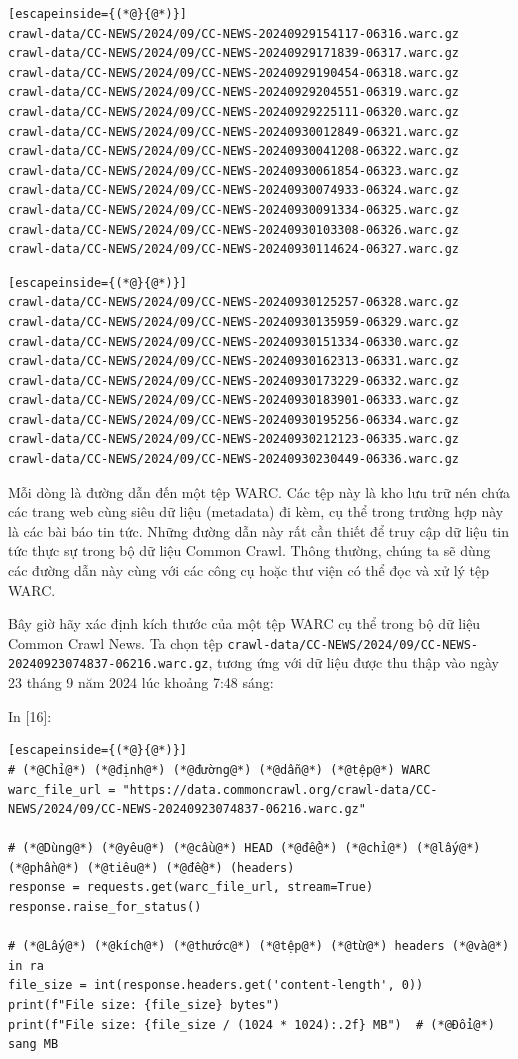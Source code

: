 \begin{lstlisting}[escapeinside={(*@}{@*)}]
crawl-data/CC-NEWS/2024/09/CC-NEWS-20240929154117-06316.warc.gz
crawl-data/CC-NEWS/2024/09/CC-NEWS-20240929171839-06317.warc.gz
crawl-data/CC-NEWS/2024/09/CC-NEWS-20240929190454-06318.warc.gz
crawl-data/CC-NEWS/2024/09/CC-NEWS-20240929204551-06319.warc.gz
crawl-data/CC-NEWS/2024/09/CC-NEWS-20240929225111-06320.warc.gz
crawl-data/CC-NEWS/2024/09/CC-NEWS-20240930012849-06321.warc.gz
crawl-data/CC-NEWS/2024/09/CC-NEWS-20240930041208-06322.warc.gz
crawl-data/CC-NEWS/2024/09/CC-NEWS-20240930061854-06323.warc.gz
crawl-data/CC-NEWS/2024/09/CC-NEWS-20240930074933-06324.warc.gz
crawl-data/CC-NEWS/2024/09/CC-NEWS-20240930091334-06325.warc.gz
crawl-data/CC-NEWS/2024/09/CC-NEWS-20240930103308-06326.warc.gz
crawl-data/CC-NEWS/2024/09/CC-NEWS-20240930114624-06327.warc.gz
\end{lstlisting}

\begin{lstlisting}[escapeinside={(*@}{@*)}]
crawl-data/CC-NEWS/2024/09/CC-NEWS-20240930125257-06328.warc.gz
crawl-data/CC-NEWS/2024/09/CC-NEWS-20240930135959-06329.warc.gz
crawl-data/CC-NEWS/2024/09/CC-NEWS-20240930151334-06330.warc.gz
crawl-data/CC-NEWS/2024/09/CC-NEWS-20240930162313-06331.warc.gz
crawl-data/CC-NEWS/2024/09/CC-NEWS-20240930173229-06332.warc.gz
crawl-data/CC-NEWS/2024/09/CC-NEWS-20240930183901-06333.warc.gz
crawl-data/CC-NEWS/2024/09/CC-NEWS-20240930195256-06334.warc.gz
crawl-data/CC-NEWS/2024/09/CC-NEWS-20240930212123-06335.warc.gz
crawl-data/CC-NEWS/2024/09/CC-NEWS-20240930230449-06336.warc.gz
\end{lstlisting}

Mỗi dòng là đường dẫn đến một tệp WARC. Các tệp này là kho lưu trữ nén chứa các trang web cùng siêu dữ liệu (metadata) đi kèm, cụ thể trong trường hợp này là các bài báo tin tức. Những đường dẫn này rất cần thiết để truy cập dữ liệu tin tức thực sự trong bộ dữ liệu Common Crawl. Thông thường, chúng ta sẽ dùng các đường dẫn này cùng với các công cụ hoặc thư viện có thể đọc và xử lý tệp WARC.

Bây giờ hãy xác định kích thước của một tệp WARC cụ thể trong bộ dữ liệu Common Crawl News. Ta chọn tệp \texttt{crawl-data/CC-NEWS/2024/09/CC-NEWS-20240923074837-06216.warc.gz}, tương ứng với dữ liệu được thu thập vào ngày 23 tháng 9 năm 2024 lúc khoảng 7:48 sáng:

In {[}16{]}:

\begin{lstlisting}[escapeinside={(*@}{@*)}]
# (*@Chỉ@*) (*@định@*) (*@đường@*) (*@dẫn@*) (*@tệp@*) WARC
warc_file_url = "https://data.commoncrawl.org/crawl-data/CC-NEWS/2024/09/CC-NEWS-20240923074837-06216.warc.gz"

# (*@Dùng@*) (*@yêu@*) (*@cầu@*) HEAD (*@để@*) (*@chỉ@*) (*@lấy@*) (*@phần@*) (*@tiêu@*) (*@đề@*) (headers)
response = requests.get(warc_file_url, stream=True)
response.raise_for_status()

# (*@Lấy@*) (*@kích@*) (*@thước@*) (*@tệp@*) (*@từ@*) headers (*@và@*) in ra
file_size = int(response.headers.get('content-length', 0))
print(f"File size: {file_size} bytes")
print(f"File size: {file_size / (1024 * 1024):.2f} MB")  # (*@Đổi@*) sang MB
\end{lstlisting}

